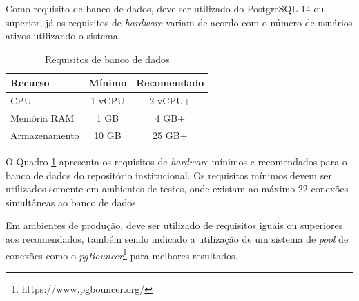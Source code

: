 Como requisito de banco de dados, deve ser utilizado do PostgreSQL 14 ou superior,
já os requisitos de \emph{hardware} variam de acordo com o número de usuários ativos
utilizando o sistema.

\begin{table}[H]
    \caption{Requisitos de banco de dados}
    \label{quad:requisitos-database}
    \begin{tabular}{|p{9.7cm}|c|c|}
        \hline
        {\textbf{Recurso}} & {\textbf{Mínimo}} & {\textbf{Recomendado}} \\ \hline
        {CPU}              & {1 vCPU}          & {2 vCPU+ }             \\ \hline
        {Memória RAM}      & {1 GB}            & {4 GB+ }               \\ \hline
        {Armazenamento}    & {10 GB}           & {25 GB+ }              \\ \hline
    \end{tabular}
\end{table}

O Quadro \ref{quad:requisitos-database} apresenta os requisitos de \emph{hardware}
mínimos e recomendados para o banco de dados do repositório institucional.
Os requisitos mínimos devem ser utilizados somente em ambientes de testes,
onde existam ao máximo 22 conexões simultâneas ao banco de dados.

Em ambientes de produção, deve ser utilizado de requisitos iguais ou superiores
aos recomendados, também sendo indicado a utilização de um sistema de \emph{pool}
de conexões como o \emph{pgBouncer}\footnote{https://www.pgbouncer.org/}
para melhores resultados.

